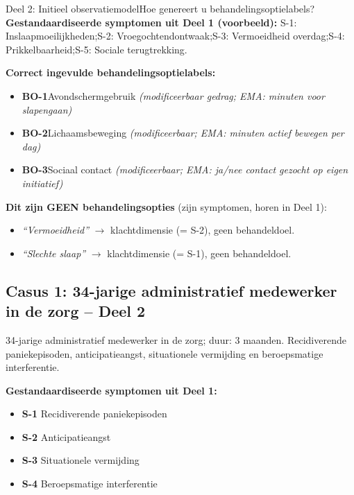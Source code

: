 \documentclass[11pt,a4paper]{article}
\begin{document}
\begin{voorbeeldbox}{Deel 2: Initieel observatiemodel}{Hoe genereert u behandelingsoptielabels?}
\small
\textbf{Gestandaardiseerde symptomen uit Deel 1 (voorbeeld):}
S-1: Inslaapmoeilijkheden;\enspace S-2: Vroegochtendontwaak;\enspace S-3: Vermoeidheid overdag;\enspace S-4: Prikkelbaarheid;\enspace S-5: Sociale terugtrekking.

\medskip
\textbf{Correct ingevulde behandelingsoptielabels:}
\begin{itemize}[topsep=2pt,itemsep=1pt]
\item \textbf{BO-1}\enspace Avondschermgebruik
  \hfill\textit{(modificeerbaar gedrag; EMA: minuten voor slapengaan)}
\item \textbf{BO-2}\enspace Lichaamsbeweging
  \hfill\textit{(modificeerbaar; EMA: minuten actief bewegen per dag)}
\item \textbf{BO-3}\enspace Sociaal contact
  \hfill\textit{(modificeerbaar; EMA: ja/nee contact gezocht op eigen initiatief)}
\end{itemize}

\medskip
\textbf{\color{StrongRed}Dit zijn GEEN behandelingsopties} (zijn symptomen, horen in Deel 1):
\begin{itemize}[topsep=1pt,itemsep=0pt]
\item \textit{``Vermoeidheid''} $\rightarrow$ klachtdimensie (= S-2), geen behandeldoel.
\item \textit{``Slechte slaap''} $\rightarrow$ klachtdimensie (= S-1), geen behandeldoel.
\end{itemize}
\end{voorbeeldbox}

\vspace{0.5em}

\newpage
\subsection*{Casus 1: 34-jarige administratief medewerker in de zorg -- Deel 2}

\begin{complaintbox}[title={Casus 1: verkorte klachtomschrijving}]
\small 34-jarige administratief medewerker in de zorg; duur: 3 maanden. Recidiverende paniekepisoden, anticipatieangst, situationele vermijding en beroepsmatige interferentie.
\end{complaintbox}

\begin{contextbox}
\small\textbf{Gestandaardiseerde symptomen uit Deel 1:}
\begin{itemize}[topsep=2pt,itemsep=1pt]
\item \textbf{S-1} Recidiverende paniekepisoden
\item \textbf{S-2} Anticipatieangst
\item \textbf{S-3} Situationele vermijding
\item \textbf{S-4} Beroepsmatige interferentie
\end{itemize}
\end{contextbox}
\end{document}
